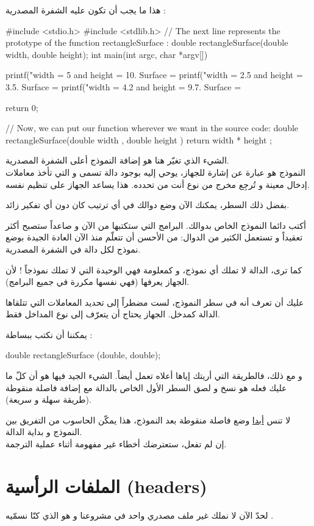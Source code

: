 هذا ما يجب أن تكون عليه الشفرة المصدرية :
\begin{Csource}
#include <stdio.h>
#include <stdlib.h>
// The next line represents the prototype of the function rectangleSurface :
double rectangleSurface(double width, double height);
int main(int argc, char *argv[])
{
	printf("width = 5 and height = 10. Surface = %
	printf("width = 2.5 and height = 3.5. Surface = %
	printf("width = 4.2 and height = 9.7. Surface = %

	return 0;
}
// Now, we can put our function wherever we want in the source code:
double rectangleSurface(double width , double height )
{
	return width * height ;
}
\end{Csource}
الشيء الذي تغيّر هنا هو إضافة النموذج أعلى الشفرة المصدرية.\\
النموذج هو عبارة عن إشارة للجهاز، يوحي إليه بوجود دالة تسمى
و التي تأخذ معاملات إدخال معينة و تُرجِع مخرج من نوع أنت من تحدده.  هذا يساعد الجهاز على تنظيم نفسه.

بفضل ذلك السطر، يمكنك الآن وضع دوالك في أي ترتيب كان دون أي تفكير زائد.

أكتب دائما النموذج الخاص بدوالك. البرامج التي ستكتبها من الآن و صاعداً ستصبح أكثر تعقيداً و تستعمل الكثير من الدوال: من الأحسن أن تتعلّم منذ الآن العادة الجيدة  بوضع نموذج لكل دالة في الشفرة المصدرية.

كما ترى، الدالة
لا تملك أي نموذج، و كمعلومة فهي الوحيدة التي لا تملك نموذجاً ! لأن الجهاز يعرفها (فهي نفسها مكررة في جميع البرامج).

عليك أن تعرف أنه في سطر النموذج، لست مضطراً إلى تحديد المعاملات التي تتلقاها الدالة كمدخل. الجهاز يحتاج أن يتعرّف إلى نوع المداخل فقط.

يمكننا أن نكتب ببساطة :
\begin{Csource}
double rectangleSurface (double, double);
\end{Csource}
و مع ذلك، فالطريقة التي أريتك إياها أعلاه تعمل أيضاً. الشيء الجيد فيها هو أن كلّ ما عليك فعله هو نسخ و لصق السطر الأول الخاص بالدالة مع إضافة فاصلة منقوطة (طريقة سهلة و سريعة).
\begin{critical}
  لا تنس
\underline{أبدا}
وضع فاصلة منقوطة بعد النموذج، هذا يمكّن الحاسوب من التفريق بين النموذج و بداية الدالة.\\
إن لم تفعل، ستعترضك أخطاء غير مفهومة أثناء عملية الترجمة.
\end{critical}

\section{الملفات الرأسية
(\textenglish{headers})}
لحدّ الآن لا نملك غير ملف مصدري واحد في مشروعنا و هو الذي كنّا نسمّيه
.

